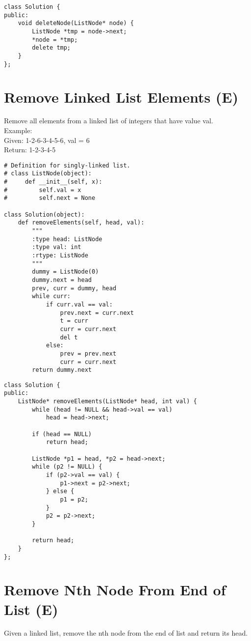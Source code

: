\begin{lstlisting}
class Solution {
public:
    void deleteNode(ListNode* node) {
        ListNode *tmp = node->next;
        *node = *tmp;
        delete tmp;
    }
};
\end{lstlisting} 


\section{Remove Linked List Elements (E)}
Remove all elements from a linked list of integers that have value val.\\

Example:\\
Given: 1-2-6-3-4-5-6, val = 6\\
Return: 1-2-3-4-5 \\

\begin{lstlisting}
# Definition for singly-linked list.
# class ListNode(object):
#     def __init__(self, x):
#         self.val = x
#         self.next = None

class Solution(object):
    def removeElements(self, head, val):
        """
        :type head: ListNode
        :type val: int
        :rtype: ListNode
        """
        dummy = ListNode(0)
        dummy.next = head
        prev, curr = dummy, head
        while curr:
            if curr.val == val:
                prev.next = curr.next  
                t = curr
                curr = curr.next
                del t
            else:
                prev = prev.next
                curr = curr.next
        return dummy.next
\end{lstlisting}

\begin{lstlisting}
class Solution {
public:
    ListNode* removeElements(ListNode* head, int val) {
        while (head != NULL && head->val == val)
            head = head->next;
            
        if (head == NULL)
            return head;
        
        ListNode *p1 = head, *p2 = head->next;
        while (p2 != NULL) {
            if (p2->val == val) {
                p1->next = p2->next;
            } else {
                p1 = p2;
            }
            p2 = p2->next;
        }
        
        return head;
    }
};
\end{lstlisting}


\section{Remove Nth Node From End of List (E)}
Given a linked list, remove the nth node from the end of list and return its head.\\

